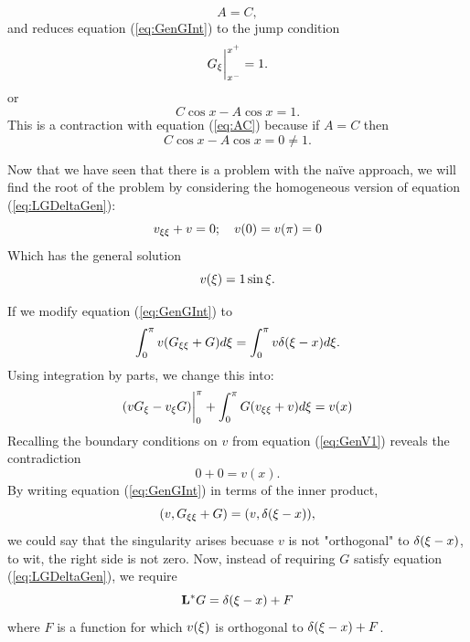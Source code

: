     \begin{equation}\label{eq:AC}
        A=C,
    \end{equation}
    and reduces equation (\ref{eq:GenGInt}) to the jump condition 
    \begin{equation*}
        G_\xi\biggr\rvert_{x^-}^{x^+} = 1.
    \end{equation*}
    or
    \begin{equation*}
        C\cos x - A\cos x = 1.
    \end{equation*}
    This is a contraction with equation (\ref{eq:AC}) because if \(A=C\) then 
    \begin{equation*}
        C\cos x -A\cos x = 0 \neq 1.
    \end{equation*}

    Now that we have seen that there is a problem with the na\"ive approach, we will find the root of the problem by considering the homogeneous version of equation (\ref{eq:LGDeltaGen}):
    \begin{equation}\label{eq:GenV1}
        v_{\xi\xi} + v = 0;\quad v(0)=v(\pi)=0
    \end{equation}
    Which has the general solution 
    \begin{equation*}
        v(\xi) = 1 \sin \xi.
    \end{equation*}

    If we modify equation (\ref{eq:GenGInt}) to 
    \begin{equation}\label{eq:innerCont}
            \int_{0}^{\pi} v(G_{\xi\xi}+G) d\xi = \int_{0}^{\pi} v\delta(\xi-x) d\xi.
    \end{equation}
    Using integration by parts, we change this into:
    \begin{equation*}
        (vG_\xi - v_\xi G)\biggr\rvert_{0}^{\pi} + \int_{0}^{\pi} G(v_{\xi\xi}+v)d\xi = v(x) 
    \end{equation*}
    Recalling the boundary conditions on \(v\) from equation (\ref{eq:GenV1}) reveals the contradiction
    \begin{equation*}
        0+0 = v(x).
    \end{equation*}
    By writing equation (\ref{eq:GenGInt}) in terms of the inner product,
    \begin{equation*}
        (v, G_{\xi\xi}+G) = (v, \delta(\xi-x)),
    \end{equation*}
    we could say that the singularity arises becuase \(v\) is not "orthogonal" to \(\delta(\xi-x)\), to wit, the right side is not zero. Now, instead of requiring \(G\) satisfy equation (\ref{eq:LGDeltaGen}), we require
    \begin{equation*}
        \mathrm{\bf{L^*}} G = \delta(\xi-x) + F
    \end{equation*}
    where \(F\) is a function for which \(v(\xi)\) is orthogonal to \(\delta(\xi-x) + F\). 

